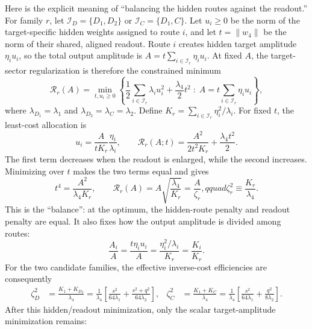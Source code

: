 \documentclass[10pt]{article}
\begin{document}
Here is the explicit meaning of ``balancing the hidden routes against the readout.''  For
family $r$, let $\mathcal I_D=\{D_1,D_2\}$ or $\mathcal I_C=\{D_1,C\}$.  Let $u_i\geq0$ be
the norm of the target-specific hidden weights assigned to route $i$, and let
$t=\|w_4\|$ be the norm of their shared, aligned readout.  Route $i$ creates hidden target
amplitude $\eta_i u_i$, so the total output amplitude is
$A=t\sum_{i\in\mathcal I_r}\eta_i u_i$.  At fixed $A$, the target-sector regularization is
therefore the constrained minimum
\begin{equation}
\mathcal R_r(A)=
\min_{t,u_i\geq0}\left\{
\frac12\sum_{i\in\mathcal I_r}\lambda_i u_i^2+\frac{\lambda_4}{2}t^2
\;:\; A=t\sum_{i\in\mathcal I_r}\eta_i u_i\right\},
\label{eq:balance-problem}
\end{equation}
where $\lambda_{D_1}=\lambda_1$ and $\lambda_{D_2}=\lambda_C=\lambda_2$.  Define
$K_r=\sum_{i\in\mathcal I_r}\eta_i^2/\lambda_i$.  For fixed $t$, the least-cost allocation is
\begin{equation}
u_i=\frac{A}{tK_r}\frac{\eta_i}{\lambda_i},\qquad
\mathcal R_r(A;t)=\frac{A^2}{2t^2K_r}+\frac{\lambda_4t^2}{2}.
\label{eq:hidden-allocation}
\end{equation}
The first term decreases when the readout is enlarged, while the second increases.  Minimizing
over $t$ makes the two terms equal and gives
\begin{equation}
t^4=\frac{A^2}{\lambda_4K_r},\qquad
\mathcal R_r(A)=A\sqrt{\frac{\lambda_4}{K_r}}=\frac{A}{\zeta_r},qquad
\zeta_r^2\equiv\frac{K_r}{\lambda_4}.
\label{eq:balanced-cost}
\end{equation}
This is the ``balance'': at the optimum, the hidden-route penalty and readout penalty are equal.
It also fixes how the output amplitude is divided among routes:
\begin{equation}
\frac{A_i}{A}=\frac{t\eta_i u_i}{A}
=\frac{\eta_i^2/\lambda_i}{K_r}=\frac{K_i}{K_r}.
\label{eq:route-share}
\end{equation}
For the two candidate families, the effective inverse-cost efficiencies are consequently
\begin{align}
\zeta_D^2&=\frac{K_1+K_{D_2}}{\lambda_4}
=\frac1{\lambda_4}\left[\frac{s^2}{64\lambda_1}
+\frac{s^2+q^2}{64\lambda_2}\right],&
\zeta_C^2&=\frac{K_1+K_C}{\lambda_4}
=\frac1{\lambda_4}\left[\frac{s^2}{64\lambda_1}
+\frac{q^2}{8\lambda_2}\right].
\label{eq:zetas}
\end{align}
After this hidden/readout minimization, only the scalar target-amplitude minimization remains:
\end{document}
